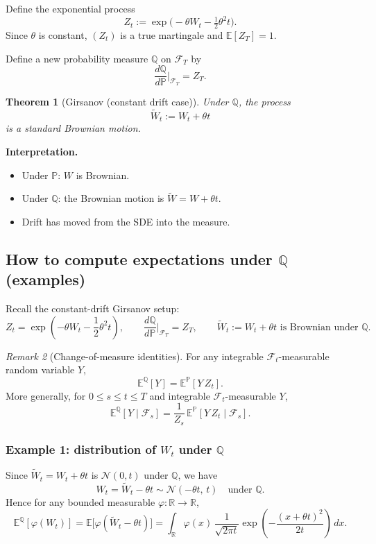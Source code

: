 \documentclass[11pt]{article}
\newtheorem{theorem}{Theorem}[section]
\theoremstyle{definition}
\theoremstyle{remark}
\newtheorem{remark}[theorem]{Remark}
\newcommand{\Pbb}{\mathbb{P}}
\newcommand{\Qbb}{\mathbb{Q}}
\newcommand{\E}{\mathbb{E}}
\newcommand{\R}{\mathbb{R}}
\newcommand{\F}{\mathcal{F}}
\newcommand{\1}{\mathbf{1}}
\theoremstyle{definition}
\begin{document}
Define the exponential process
\[
Z_t:=\exp\Big(-\theta W_t-\tfrac12\theta^2 t\Big).
\]
Since $\theta$ is constant, $(Z_t)$ is a true martingale and $\E[Z_T]=1$.

Define a new probability measure $\Qbb$ on $\mathcal F_T$ by
\[
\frac{d\Qbb}{d\Pbb}\Big|_{\mathcal F_T}=Z_T.
\]

\begin{theorem}[Girsanov (constant drift case)]
Under $\Qbb$, the process
\[
\widetilde W_t:=W_t+\theta t
\]
is a standard Brownian motion.
\end{theorem}


\textbf{Interpretation.}
\begin{itemize}
\item Under $\Pbb$: $W$ is Brownian.
\item Under $\Qbb$: the Brownian motion is $\widetilde W=W+\theta t$.
\item Drift has moved from the SDE into the measure.
\end{itemize}


\subsection*{How to compute expectations under $\Qbb$ (examples)}

Recall the constant-drift Girsanov setup:
\[
Z_t=\exp\!\left(-\theta W_t-\frac12\theta^2 t\right),\qquad
\frac{d\Qbb}{d\Pbb}\Big|_{\F_T}=Z_T,
\qquad
\widetilde W_t:=W_t+\theta t \text{ is Brownian under }\Qbb.
\]

\begin{remark}[Change-of-measure identities]
For any integrable $\F_t$-measurable random variable $Y$,
\[
\E^\Qbb[Y]=\E^\Pbb[Y\,Z_t].
\]
More generally, for $0\le s\le t\le T$ and integrable $\F_t$-measurable $Y$,
\[
\E^\Qbb[Y\mid \F_s]=\frac{1}{Z_s}\,\E^\Pbb[Y\,Z_t\mid \F_s].
\]
\end{remark}

\subsubsection*{Example 1: distribution of $W_t$ under $\Qbb$}

Since $\widetilde W_t=W_t+\theta t$ is $\mathcal N(0,t)$ under $\Qbb$, we have
\[
W_t=\widetilde W_t-\theta t \sim \mathcal N(-\theta t,\,t)\quad \text{under }\Qbb.
\]
Hence for any bounded measurable $\varphi:\R\to\R$,
\[
\E^\Qbb[\varphi(W_t)]
=
\E\Big[\varphi(\widetilde W_t-\theta t)\Big]
=
\int_{\R}\varphi(x)\,
\frac{1}{\sqrt{2\pi t}}
\exp\!\left(-\frac{(x+\theta t)^2}{2t}\right)\,dx.
\]
\end{document}

